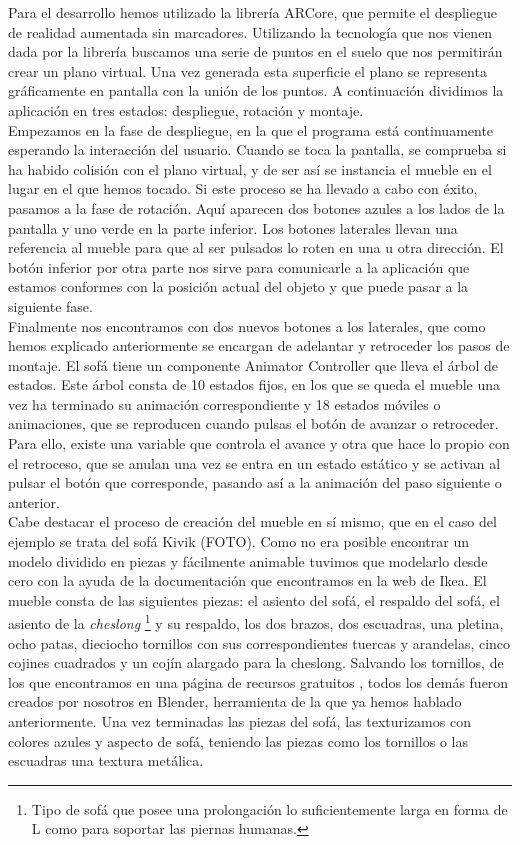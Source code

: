 Para el desarrollo hemos utilizado la librería ARCore, que permite el despliegue de realidad aumentada sin marcadores. Utilizando la tecnología que nos vienen dada por la librería buscamos una serie de puntos en el suelo que nos permitirán crear un plano virtual. Una vez generada esta superficie el plano se representa gráficamente en pantalla con la unión de los puntos. A continuación dividimos la aplicación en tres estados: despliegue, rotación y montaje.\\ Empezamos en la fase de despliegue, en la que el programa está continuamente esperando la interacción del usuario. Cuando se toca la pantalla, se comprueba si ha habido colisión con el plano virtual, y de ser así se instancia el mueble en el lugar en el que hemos tocado. Si este proceso se ha llevado a cabo con éxito, pasamos a la fase de rotación. Aquí aparecen dos botones azules a los lados de la pantalla y uno verde en la parte inferior. Los botones laterales llevan una referencia al mueble para que al ser pulsados lo roten en una u otra dirección. El botón inferior por otra parte nos sirve para comunicarle a la aplicación que estamos conformes con la posición actual del objeto y que puede pasar a la siguiente fase.\\ Finalmente nos encontramos con dos nuevos botones a los laterales, que como hemos explicado anteriormente se encargan de adelantar y retroceder los pasos de montaje. El sofá tiene un componente Animator Controller que lleva el árbol de estados. Este árbol consta de 10 estados fijos, en los que se queda el mueble una vez ha terminado su animación correspondiente y 18 estados móviles o animaciones, que se reproducen cuando pulsas el botón de avanzar o retroceder. Para ello, existe una variable que controla el avance y otra que hace lo propio con el retroceso, que se anulan una vez se entra en un estado estático y se activan al pulsar el botón que corresponde, pasando así a la animación del paso siguiente o anterior.\\
Cabe destacar el proceso de creación del mueble en sí mismo, que en el caso del ejemplo se trata del sofá Kivik (FOTO). Como no era posible encontrar un modelo dividido en piezas y fácilmente animable tuvimos que modelarlo desde cero con la ayuda de la documentación que encontramos en la web de Ikea. El mueble consta de las siguientes piezas: el asiento del sofá, el respaldo del sofá, el asiento de la \textit{cheslong} \footnote{ Tipo de sofá que posee una prolongación lo suficientemente larga en forma de L como para soportar las piernas humanas.} y su respaldo, los dos brazos, dos escuadras, una pletina, ocho patas, dieciocho tornillos con sus correspondientes tuercas y arandelas, cinco cojines cuadrados y un cojín alargado para la cheslong. Salvando los tornillos, de los que encontramos en una página de recursos gratuitos \cite{tornillos}, todos los demás fueron creados por nosotros en Blender, herramienta de la que ya hemos hablado anteriormente. Una vez terminadas las piezas del sofá, las texturizamos con colores azules y aspecto de sofá, teniendo las piezas como los tornillos o las escuadras una textura metálica.\\
